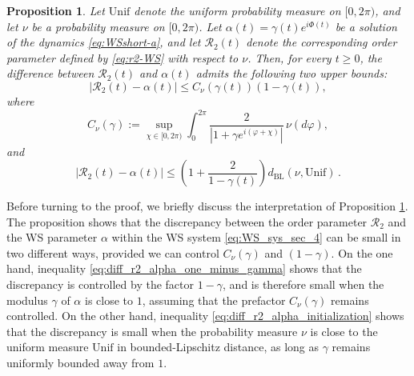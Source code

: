\documentclass[10pt]{article}
\newtheorem{proposition}[theorem]{Proposition}
\theoremstyle{definition}
\theoremstyle{definition}
\numberwithin{equation}{section}
\newcommand{\CR}{\mathcal{R}}
\newcommand{\BL}{\mathrm{BL}}
\newcommand{\Unif}{\mathrm{Unif}}
\begin{document}
\begin{proposition}\label{prop:diff_r2_alpha} 
Let $\Unif$ denote the uniform probability measure on $[0,2\pi)$, and let $\nu$ be a probability measure on $[0,2\pi)$.
Let $\alpha(t)=\gamma(t)e^{i\Phi(t)}$ be a solution of the dynamics
\eqref{eq:WSshort-a}, and let $\CR_2(t)$ denote the corresponding order parameter defined by \eqref{eq:r2-WS} with respect to $\nu$.
Then, for every $t \geq 0$, the difference between $\CR_2(t)$ and $\alpha(t)$ admits the following two upper bounds:
\begin{equation}\label{eq:diff_r2_alpha_one_minus_gamma}
|\CR_2(t)-\alpha(t)|\leq  C_{\nu}(\gamma(t)) (1-\gamma(t)),
\end{equation}
where
\begin{equation}\label{eq:C_nu_condition}
    C_{\nu}(\gamma) :=\sup_{\chi\in[0,2\pi)}\int_0^{2\pi} \frac{2}{|1+\gamma e^{i(\varphi+\chi)}|}\,\nu(d\varphi),
\end{equation}
and
\begin{equation}\label{eq:diff_r2_alpha_initialization}
|\CR_2(t)-\alpha(t)| \leq \left( 1 + \frac{2}{1 - \gamma(t)} \right) d_{\BL} (\nu, \Unif) \, .
\end{equation}
\end{proposition}
Before turning to the proof, we briefly discuss the interpretation of Proposition \ref{prop:diff_r2_alpha}.
The proposition shows that the discrepancy between the order parameter $\CR_2$ and the WS parameter $\alpha$ within the WS system \eqref{eq:WS_sys_sec_4} can be small in two different ways, provided we can control $C_\nu(\gamma)$ and $(1 - \gamma)$.
On the one hand, inequality \eqref{eq:diff_r2_alpha_one_minus_gamma} shows that the discrepancy is controlled by the factor $1 - \gamma$, and is therefore small when the modulus $\gamma$ of $\alpha$ is close to $1$, assuming that the prefactor $C_{\nu}(\gamma)$ remains controlled.
On the other hand, inequality \eqref{eq:diff_r2_alpha_initialization} shows that the discrepancy is small when the probability measure $\nu$ is close to the uniform measure $\Unif$ in bounded-Lipschitz distance, as long as $\gamma$ remains uniformly bounded away from $1$.
\end{document}
